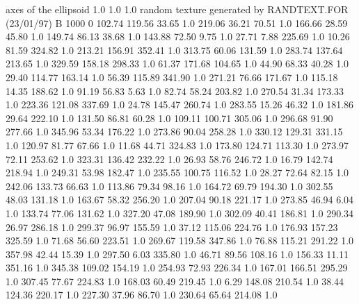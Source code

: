 axes of the ellipsoid
  1.0  1.0  1.0
random texture generated by RANDTEXT.FOR (23/01/97)
B  1000   0
    102.74    119.56     33.65  1.0
    219.06     36.21     70.51  1.0
    166.66     28.59     45.80  1.0
    149.74     86.13     38.68  1.0
    143.88     72.50      9.75  1.0
     27.71      7.88    225.69  1.0
     10.26     81.59    324.82  1.0
    213.21    156.91    352.41  1.0
    313.75     60.06    131.59  1.0
    283.74    137.64    213.65  1.0
    329.59    158.18    298.33  1.0
     61.37    171.68    104.65  1.0
     44.90     68.33     40.28  1.0
     29.40    114.77    163.14  1.0
     56.39    115.89    341.90  1.0
    271.21     76.66    171.67  1.0
    115.18     14.35    188.62  1.0
     91.19     56.83      5.63  1.0
     82.74     58.24    203.82  1.0
    270.54     31.34    173.33  1.0
    223.36    121.08    337.69  1.0
     24.78    145.47    260.74  1.0
    283.55     15.26     46.32  1.0
    181.86     29.64    222.10  1.0
    131.50     86.81     60.28  1.0
    109.11    100.71    305.06  1.0
    296.68     91.90    277.66  1.0
    345.96     53.34    176.22  1.0
    273.86     90.04    258.28  1.0
    330.12    129.31    331.15  1.0
    120.97     81.77     67.66  1.0
     11.68     44.71    324.83  1.0
    173.80    124.71    113.30  1.0
    273.97     72.11    253.62  1.0
    323.31    136.42    232.22  1.0
     26.93     58.76    246.72  1.0
     16.79    142.74    218.94  1.0
    249.31     53.98    182.47  1.0
    235.55    100.75    116.52  1.0
     28.27     72.64     82.15  1.0
    242.06    133.73     66.63  1.0
    113.86     79.34     98.16  1.0
    164.72     69.79    194.30  1.0
    302.55     48.03    131.18  1.0
    163.67     58.32    256.20  1.0
    207.04     90.18    221.17  1.0
    273.85     46.94      6.04  1.0
    133.74     77.06    131.62  1.0
    327.20     47.08    189.90  1.0
    302.09     40.41    186.81  1.0
    290.34     26.97    286.18  1.0
    299.37     96.97    155.59  1.0
     37.12    115.06    224.76  1.0
    176.93    157.23    325.59  1.0
     71.68     56.60    223.51  1.0
    269.67    119.58    347.86  1.0
     76.88    115.21    291.22  1.0
    357.98     42.44     15.39  1.0
    297.50      6.03    335.80  1.0
     46.71     89.56    108.16  1.0
    156.33     11.11    351.16  1.0
    345.38    109.02    154.19  1.0
    254.93     72.93    226.34  1.0
    167.01    166.51    295.29  1.0
    307.45     77.67    224.83  1.0
    168.03     60.49    219.45  1.0
      6.29    148.08    210.54  1.0
     38.44    124.36    220.17  1.0
    227.30     37.96     86.70  1.0
    230.64     65.64    214.08  1.0
